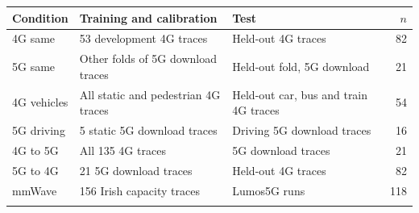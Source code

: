 \begin{tabular}{@{}lllr@{}}
\toprule
Condition & Training and calibration & Test & $n$ \\
\midrule
4G same & 53 development 4G traces & Held-out 4G traces & 82 \\
5G same & Other folds of 5G download traces & Held-out fold, 5G download & 21 \\
4G vehicles & All static and pedestrian 4G traces & Held-out car, bus and train 4G traces & 54 \\
5G driving & 5 static 5G download traces & Driving 5G download traces & 16 \\
4G to 5G & All 135 4G traces & 5G download traces & 21 \\
5G to 4G & 21 5G download traces & Held-out 4G traces & 82 \\
mmWave & 156 Irish capacity traces & Lumos5G runs & 118 \\
\botrule
\end{tabular}
